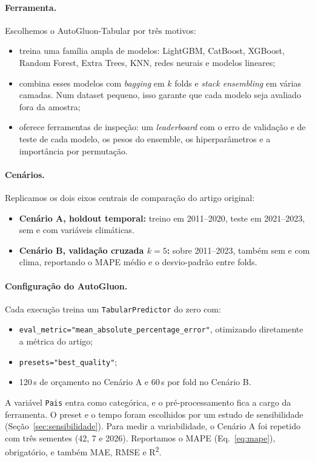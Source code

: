 \documentclass[a4paper,11pt]{article}
\begin{document}
\paragraph{Ferramenta.} Escolhemos o AutoGluon-Tabular \citep{erickson2020autogluon} por três motivos:
\begin{itemize}
  \item treina uma família ampla de modelos: LightGBM, CatBoost, XGBoost, Random Forest,
  Extra Trees, KNN, redes neurais e modelos lineares;
  \item combina esses modelos com \textit{bagging} em $k$ folds e \textit{stack
  ensembling} em várias camadas. Num dataset pequeno, isso garante que cada modelo seja
  avaliado fora da amostra;
  \item oferece ferramentas de inspeção: um \textit{leaderboard} com o erro de validação e
  de teste de cada modelo, os pesos do ensemble, os hiperparâmetros e a importância por
  permutação.
\end{itemize}

\paragraph{Cenários.} Replicamos os dois eixos centrais de comparação do artigo original:

\begin{itemize}
  \item \textbf{Cenário A, holdout temporal:} treino em 2011--2020, teste em 2021--2023,
  sem e com variáveis climáticas.
  \item \textbf{Cenário B, validação cruzada $k=5$:} sobre 2011--2023, também sem e com
  clima, reportando o MAPE médio e o desvio-padrão entre folds.
\end{itemize}

\paragraph{Configuração do AutoGluon.} Cada execução treina um \texttt{TabularPredictor} do
zero com:
\begin{itemize}
  \item \texttt{eval\_metric="mean\_absolute\_percentage\_error"}, otimizando diretamente a
  métrica do artigo;
  \item \texttt{presets="best\_quality"};
  \item 120\,s de orçamento no Cenário A e 60\,s por fold no Cenário B.
\end{itemize}
A variável \texttt{Pais} entra como categórica, e o pré-processamento fica a cargo da
ferramenta. O preset e o tempo foram escolhidos por um estudo de sensibilidade
(Seção~\ref{sec:sensibilidade}). Para medir a variabilidade, o Cenário A foi repetido com
três sementes (42, 7 e 2026). Reportamos o MAPE (Eq.~\ref{eq:mape}), obrigatório, e
também MAE, RMSE e R\textsuperscript{2}.
\end{document}
